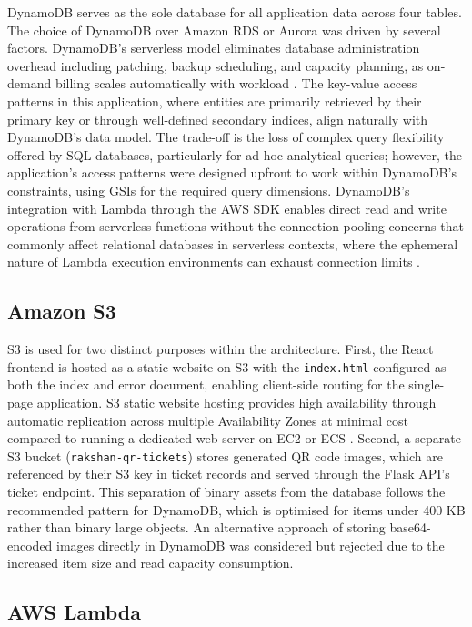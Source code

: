 \documentclass[conference]{IEEEtran}
\begin{document}
DynamoDB serves as the sole database for all application data across four tables. The choice of DynamoDB over Amazon RDS or Aurora was driven by several factors. DynamoDB's serverless model eliminates database administration overhead including patching, backup scheduling, and capacity planning, as on-demand billing scales automatically with workload \cite{aws2024dynamodb}. The key-value access patterns in this application, where entities are primarily retrieved by their primary key or through well-defined secondary indices, align naturally with DynamoDB's data model. The trade-off is the loss of complex query flexibility offered by SQL databases, particularly for ad-hoc analytical queries; however, the application's access patterns were designed upfront to work within DynamoDB's constraints, using GSIs for the required query dimensions. DynamoDB's integration with Lambda through the AWS SDK enables direct read and write operations from serverless functions without the connection pooling concerns that commonly affect relational databases in serverless contexts, where the ephemeral nature of Lambda execution environments can exhaust connection limits \cite{awslambdadynamo2023}.

\subsection{Amazon S3}

S3 is used for two distinct purposes within the architecture. First, the React frontend is hosted as a static website on S3 with the \texttt{index.html} configured as both the index and error document, enabling client-side routing for the single-page application. S3 static website hosting provides high availability through automatic replication across multiple Availability Zones at minimal cost compared to running a dedicated web server on EC2 or ECS \cite{awss3hosting2024}. Second, a separate S3 bucket (\texttt{rakshan-qr-tickets}) stores generated QR code images, which are referenced by their S3 key in ticket records and served through the Flask API's ticket endpoint. This separation of binary assets from the database follows the recommended pattern for DynamoDB, which is optimised for items under 400 KB rather than binary large objects. An alternative approach of storing base64-encoded images directly in DynamoDB was considered but rejected due to the increased item size and read capacity consumption.

\subsection{AWS Lambda}
\end{document}
